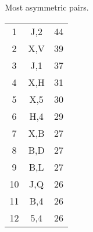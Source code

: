 \documentclass[professionalfonts, hyperref={pdfpagelabels=false,
  colorlinks=true, linkcolor=purple}]{beamer}
\begin{document}
\appendix
 \begin{frame}
   \label{morsecode:fig_a}
   \centering
   \hyperlink{morsecode:fig}{}
 \end{frame}

 \begin{frame}
   \label{fig:out_of_sample_mnist}
   \begin{center}
   \hyperlink{out_of_sample_mnist}{}
   \end{center}
 \end{frame}
 
\begin{frame}
  \label{morsecode:fig_b}
  \begin{columns}
    \begin{column}{0.7\textwidth}
      \centering
      \hyperlink{morsecode:fig}{}
    \end{column}
  
  \begin{column}{0.35\textwidth}
    Most asymmetric pairs.
    \begin{tabular}{ccc}
      1 & J,2 & 44 \\
      2 & X,V & 39 \\ 
      3 & J,1 & 37 \\
      4 & X,H & 31 \\
      5 & X,5 & 30 \\
      6 & H,4 & 29 \\
      7 & X,B & 27 \\
      8 & B,D & 27 \\
      9 & B,L & 27 \\
      10 & J,Q & 26 \\
      11 & B,4 & 26 \\ 
      12 & 5,4 & 26 \\
    \end{tabular}
  \end{column}
  \end{columns}
\end{frame}



\end{document}
